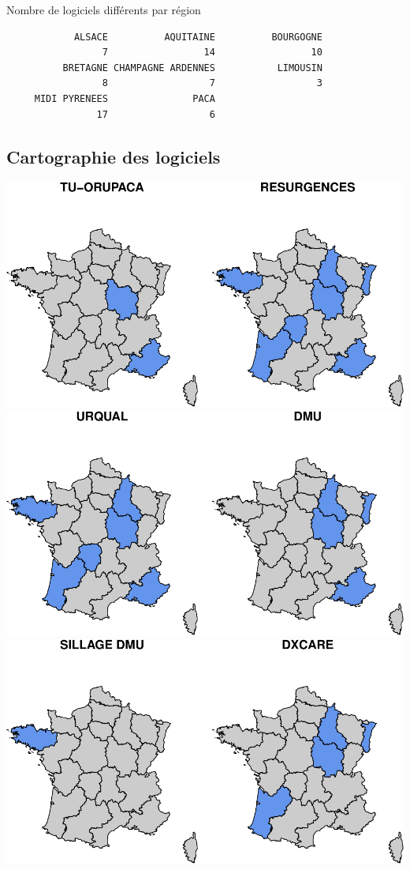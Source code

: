 \documentclass[]{article}
\begin{document}
Nombre de logiciels différents par région

\begin{verbatim}
            ALSACE          AQUITAINE          BOURGOGNE 
                 7                 14                 10 
          BRETAGNE CHAMPAGNE ARDENNES           LIMOUSIN 
                 8                  7                  3 
     MIDI PYRENEES               PACA 
                17                  6 
\end{verbatim}

\subsection{Cartographie des
logiciels}\label{cartographie-des-logiciels}

\includegraphics{septembre2015_files/figure-latex/unnamed-chunk-7-1.pdf}
\includegraphics{septembre2015_files/figure-latex/unnamed-chunk-7-2.pdf}
\includegraphics{septembre2015_files/figure-latex/unnamed-chunk-7-3.pdf}
\end{document}
